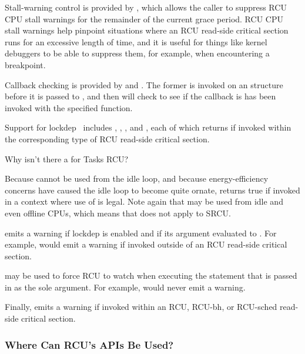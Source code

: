 Stall-warning control is provided by , which
allows the caller to suppress RCU CPU stall warnings for the remainder
of the current grace period.
RCU CPU stall warnings help pinpoint situations where an RCU read-side
critical section runs for an excessive length of time, and it is useful
for things like kernel debuggers to be able to suppress them, for example,
when encountering a breakpoint.

Callback checking is provided by  and
.
The former is invoked on an  structure before it is passed
to , and then  will
check to see if the callback is has been invoked with the specified
function.

Support for lockdep~\cite{JonathanCorbet2006lockdep} includes
,
,
, and
,
each of which returns  if invoked within the corresponding
type of RCU read-side critical section.

\QuickQuiz{}
	Why isn't there a  for Tasks RCU?
 \QuickQuizEnd

Because  cannot be used from the idle loop,
and because energy-efficiency concerns have caused the idle loop
to become quite ornate,  returns true if
invoked in a context where use of  is legal.
Note again that  may be used from idle and
even offline CPUs, which means that  does not
apply to SRCU.

 emits a warning if lockdep is enabled and if
its argument evaluated to .
For example,  would emit a
warning if invoked outside of an RCU read-side critical section.

 may be used to force RCU to watch when executing
the statement that is passed in as the sole argument.
For example, 
would never emit a warning.

Finally,   emits a warning if invoked within
an RCU, RCU-bh, or RCU-sched read-side critical section.

\subsubsection{Where Can RCU's APIs Be Used?}
\label{sec:defer:Where Can RCU's APIs Be Used?}

